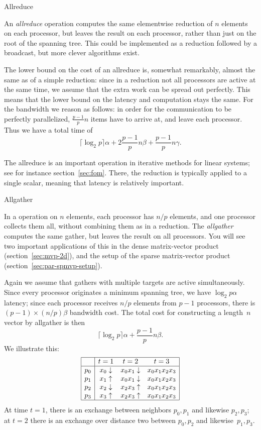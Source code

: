 
 {Allreduce}
\label{sec:allreduce}

An \emph{allreduce} operation computes the same elementwise reduction of $n$
elements on each processor, but leaves the result on each processor,
rather than just on the root of the spanning tree. This could be
implemented as a reduction followed by a broadcast, but more clever
algorithms exist.

The lower bound on the cost of an allreduce is, somewhat remarkably,
almost the same as of a simple reduction: since in a reduction not all
processors are active at the same time, we assume that the extra work
can be spread out perfectly. This means that the lower bound on the
latency and computation stays the same. For the bandwidth we reason as
follows: in order for the communication to be perfectly parallelized,
$\frac{p-1}p n$ items have to arrive at, and leave each
processor. Thus we have a total time of
\[ \lceil \log_2 p\rceil\alpha +2\frac{p-1}pn\beta
    +\frac{p-1}pn\gamma. \]

The allreduce is an important operation in iterative methods for linear systems;
see for instance section~\ref{sec:fom}.
There, the reduction is typically applied to a single scalar,
meaning that latency is relatively important.


 {Allgather}

In a  operation on $n$ elements, each processor has
$n/p$ elements, and one processor collects them all, without combining
them as in a reduction. The \emph{allgather} computes the same gather,
but leaves the result on all processors.
You will see two important applications of this
in the dense matrix-vector product (section~\ref{sec:mvp-2d}),
and the setup of the sparse matrix-vector product
(section~\ref{sec:par-spmvp-setup}).

Again we assume that gathers with multiple
targets are active simultaneously. Since every processor originates a
minimum spanning tree, we have $\log_2p\alpha$ latency; since each
processor receives $n/p$ elements from $p-1$ processors, there is
$(p-1)\times(n/p)\beta$ bandwidth cost. The total cost for constructing a
length~$n$ vector by allgather is then
\[ \lceil \log_2 p\rceil\alpha +\frac{p-1}pn\beta. \]
We illustrate this:
\[
\begin{array}{|c|ccc|}
\hline
  &t=1&t=2&t=3\\ \hline
p_0&x_0\downarrow&x_0x_1\downarrow&x_0x_1x_2x_3\\
p_1&x_1\uparrow&x_0x_1\downarrow&x_0x_1x_2x_3\\
p_2&x_2\downarrow&x_2x_3\uparrow&x_0x_1x_2x_3\\
p_3&x_3\uparrow&x_2x_3\uparrow&x_0x_1x_2x_3\\
\hline
\end{array}
\]
At time $t=1$, there is an exchange between neighbors $p_0,p_1$ and
likewise $p_2,p_3$; at $t=2$ there is an exchange over distance two
between $p_0,p_2$ and likewise~$p_1,p_3$.

